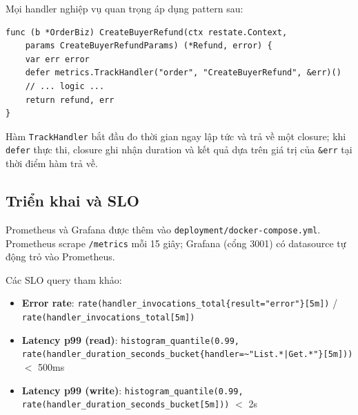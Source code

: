 Mọi handler nghiệp vụ quan trọng áp dụng pattern sau:

\begin{verbatim}
func (b *OrderBiz) CreateBuyerRefund(ctx restate.Context,
    params CreateBuyerRefundParams) (*Refund, error) {
    var err error
    defer metrics.TrackHandler("order", "CreateBuyerRefund", &err)()
    // ... logic ...
    return refund, err
}
\end{verbatim}

Hàm \texttt{TrackHandler} bắt đầu đo thời gian ngay lập tức và trả về một closure; khi \texttt{defer} thực thi, closure ghi nhận duration và kết quả dựa trên giá trị của \texttt{\&err} tại thời điểm hàm trả về.

\subsection{Triển khai và SLO}

Prometheus và Grafana được thêm vào \texttt{deployment/docker-compose.yml}. Prometheus scrape \texttt{/metrics} mỗi 15 giây; Grafana (cổng 3001) có datasource tự động trỏ vào Prometheus.

Các SLO query tham khảo:

\begin{itemize}
  \item \textbf{Error rate}: \texttt{rate(handler\_invocations\_total\{result="error"\}[5m])} / \texttt{rate(handler\_invocations\_total[5m])}
  \item \textbf{Latency p99 (read)}: \texttt{histogram\_quantile(0.99, rate(handler\_duration\_seconds\_bucket\{handler=\textasciitilde"List.*|Get.*"\}[5m]))} $<$ 500ms
  \item \textbf{Latency p99 (write)}: \texttt{histogram\_quantile(0.99, rate(handler\_duration\_seconds\_bucket[5m]))} $<$ 2s
\end{itemize}
